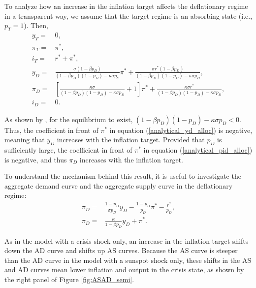 \documentclass[11pt]{article}
\begin{document}
\begin{singlespace}
		
		
		To analyze how an increase in the inflation target affects the deflationary regime in a transparent way, we assume that the target regime is an absorbing state (i.e., $p_{T}=1$). Then,
		\begin{align}
			y_T =& 0,  \\
			\pi_T =& \pi^*, \\
			i_T =& r^* + \pi^*, \\
			y_D =& \frac{\sigma(1-\beta p_D)}{(1-\beta p_D)(1-p_D) -\kappa\sigma p_C}\pi^{*} + \frac{\sigma r^*(1-\beta p_D)}{(1-\beta p_D)(1-p_D) -\kappa\sigma p_D},\label{analytical_yd_alloc}\\
			\pi_D =& \left[\frac{\kappa\sigma}{(1-\beta p_D)(1-p_D) -\kappa\sigma p_D} + 1\right]\pi^*+\frac{\kappa\sigma r^*}{(1-\beta p_D)(1-p_D) -\kappa\sigma p_D},\label{analytical_pid_alloc}\\	
			i_D =& 0.
		\end{align}
		
		\noindent As shown by \citet{NakataSchmidt2019}, for the equilibrium to exist, $(1-\beta p_D)(1-p_D) -\kappa\sigma p_D <0$. Thus, the coefficient in front of $\pi^*$ in equation (\ref{analytical_yd_alloc}) is negative, meaning that $y_D$ increases with the inflation target. Provided that $p_{D}$ is sufficiently large, the coefficient in front of $\pi^*$ in equation (\ref{analytical_pid_alloc}) is negative, and thus $\pi_D$ increases with the inflation target. 
		
		To understand the mechanism behind this result, it is useful to investigate the aggregate demand curve and the aggregate supply curve in the deflationary regime:
		\begin{align}
			\pi_D =& \frac{1-p_D}{\sigma p_D}y_D - \frac{1-p_D}{p_D}\pi^* - \frac{r^*}{p_D},\\
			\pi_D =& \frac{\kappa }{1-\beta p_D}y_D+\pi^*.
		\end{align}
		
		\noindent As in the model with a crisis shock only, an increase in the inflation target shifts down the AD curve and shifts up AS curves. Because the AS curve is steeper than the AD curve in the model with a sunspot shock only, these shifts in the AS and AD curves mean lower inflation and output in the crisis state, as shown by the right panel of Figure \ref{fig:ASAD_semi}. 
		

\end{singlespace}
\end{document}
